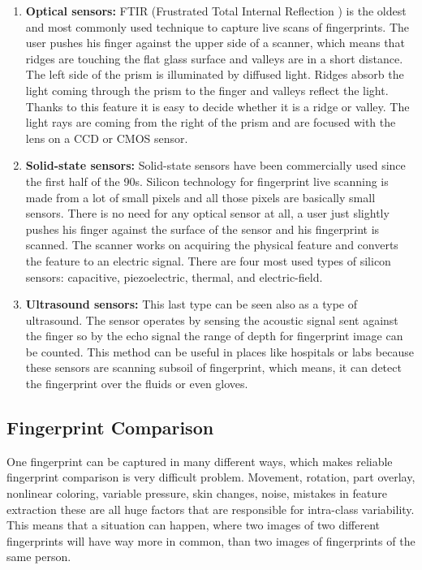 \begin{enumerate}
	\item \textbf{Optical sensors:} 
	FTIR (Frustrated Total Internal Reflection ) is the oldest and most commonly used technique to capture live scans of fingerprints. The user pushes his finger against the upper side of a scanner, which means that ridges are touching the flat glass surface and valleys are in a short distance. The left side of the prism is illuminated by diffused light. Ridges absorb the light coming through the prism to the finger and valleys reflect the light. Thanks to this feature it is easy to decide whether it is a ridge or valley. The light rays are coming from the right of the prism and are focused with the lens on a CCD or CMOS sensor. \cite{jain2007handbook} \cite{optical}
    
    \item \textbf{Solid-state sensors:}
    Solid-state sensors have been commercially used since the first half of the 90s. Silicon technology for fingerprint live scanning is made from a lot of small pixels and all those pixels are basically small sensors. There is no need for any optical sensor at all, a user just slightly pushes his finger against the surface of the sensor and his fingerprint is scanned. The scanner works on acquiring the physical feature and converts the feature to an electric signal. There are four most used types of silicon sensors: capacitive, piezoelectric, thermal, and electric-field. \cite{jain2007handbook} \cite{capacitive}
    
    \item \textbf{Ultrasound sensors:}
    This last type can be seen also as a type of ultrasound. The sensor operates by sensing the acoustic signal sent against the finger so by the echo signal the range of depth for fingerprint image can be counted. This method can be useful in places like hospitals or labs because these sensors are scanning subsoil of fingerprint, which means, it can detect the fingerprint over the fluids or even gloves. \cite{jain2007handbook} \cite{ultrasonic}
\end{enumerate}

\subsection{Fingerprint Comparison}
One fingerprint can be captured in many different ways, which makes reliable fingerprint comparison is very difficult problem. Movement, rotation, part overlay, nonlinear coloring, variable pressure, skin changes, noise, mistakes in feature extraction these are all huge factors that are responsible for intra-class variability. This means that a situation can happen, where two images of two different fingerprints will have way more in common, than two images of fingerprints of the same person. \cite{frr_described} \cite{wayman2005biometric}

